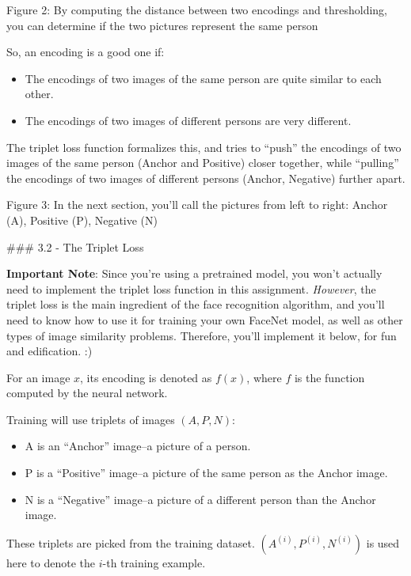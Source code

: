 \documentclass[11pt]{article}
\providecommand{\tightlist}{%
      \setlength{\itemsep}{0pt}\setlength{\parskip}{0pt}}
\begin{document}
Figure 2: By computing the distance between two encodings and
thresholding, you can determine if the two pictures represent the same
person

So, an encoding is a good one if:

\begin{itemize}
\tightlist
\item
  The encodings of two images of the same person are quite similar to
  each other.
\item
  The encodings of two images of different persons are very different.
\end{itemize}

The triplet loss function formalizes this, and tries to ``push'' the
encodings of two images of the same person (Anchor and Positive) closer
together, while ``pulling'' the encodings of two images of different
persons (Anchor, Negative) further apart.

Figure 3: In the next section, you'll call the pictures from left to
right: Anchor (A), Positive (P), Negative (N)

    \#\#\# 3.2 - The Triplet Loss

\textbf{Important Note}: Since you're using a pretrained model, you
won't actually need to implement the triplet loss function in this
assignment. \emph{However}, the triplet loss is the main ingredient of
the face recognition algorithm, and you'll need to know how to use it
for training your own FaceNet model, as well as other types of image
similarity problems. Therefore, you'll implement it below, for fun and
edification. :)

For an image \(x\), its encoding is denoted as \(f(x)\), where \(f\) is
the function computed by the neural network.

Training will use triplets of images \((A, P, N)\):

\begin{itemize}
\tightlist
\item
  A is an ``Anchor'' image--a picture of a person.
\item
  P is a ``Positive'' image--a picture of the same person as the Anchor
  image.
\item
  N is a ``Negative'' image--a picture of a different person than the
  Anchor image.
\end{itemize}

These triplets are picked from the training dataset.
\((A^{(i)}, P^{(i)}, N^{(i)})\) is used here to denote the \(i\)-th
training example.
\end{document}
